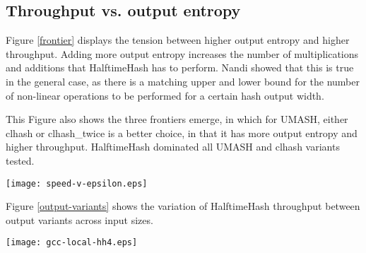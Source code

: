 \documentclass[sigconf, nonacm]{acmart}
\begin{document}
\subsection{Throughput vs. output entropy}

Figure \ref{frontier} displays the tension between higher output entropy and higher throughput.
Adding more output entropy increases the number of multiplications and additions that HalftimeHash has to perform.
Nandi showed that this is true in the general case, as there is a matching upper and lower bound for the number of non-linear operations to be performed for a certain hash output width.

This Figure also shows the three frontiers emerge, in which for UMASH, either clhash or clhash\_twice is a better choice, in that it has more output entropy and higher throughput.
HalftimeHash dominated all UMASH and clhash variants tested.

\texttt{[image: speed-v-epsilon.eps]}




Figure \ref{output-variants} shows the variation of HalftimeHash throughput between output variants across input sizes.

\texttt{[image: gcc-local-hh4.eps]}
\end{document}
